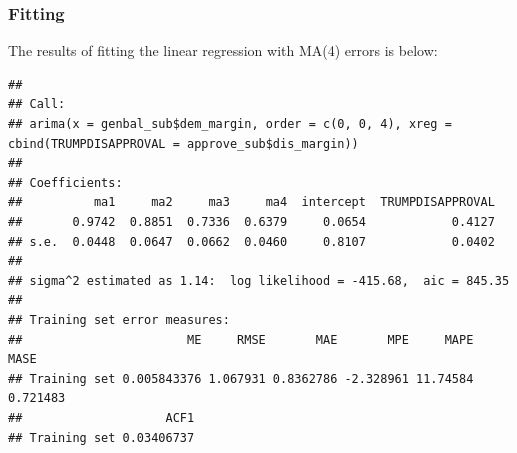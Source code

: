 \documentclass[]{article}
\newenvironment{Shaded}{\begin{snugshade}}{\end{snugshade}}
\newcommand{\KeywordTok}[1]{\textcolor[rgb]{0.13,0.29,0.53}{\textbf{#1}}}
\newcommand{\DataTypeTok}[1]{\textcolor[rgb]{0.13,0.29,0.53}{#1}}
\newcommand{\DecValTok}[1]{\textcolor[rgb]{0.00,0.00,0.81}{#1}}
\newcommand{\StringTok}[1]{\textcolor[rgb]{0.31,0.60,0.02}{#1}}
\newcommand{\OperatorTok}[1]{\textcolor[rgb]{0.81,0.36,0.00}{\textbf{#1}}}
\newcommand{\NormalTok}[1]{#1}
\begin{document}
\subsubsection{Fitting}\label{fitting-1}

The results of fitting the linear regression with MA(4) errors is below:

\begin{Shaded}
\end{Shaded}

\begin{verbatim}
## 
## Call:
## arima(x = genbal_sub$dem_margin, order = c(0, 0, 4), xreg = cbind(TRUMPDISAPPROVAL = approve_sub$dis_margin))
## 
## Coefficients:
##          ma1     ma2     ma3     ma4  intercept  TRUMPDISAPPROVAL
##       0.9742  0.8851  0.7336  0.6379     0.0654            0.4127
## s.e.  0.0448  0.0647  0.0662  0.0460     0.8107            0.0402
## 
## sigma^2 estimated as 1.14:  log likelihood = -415.68,  aic = 845.35
## 
## Training set error measures:
##                       ME     RMSE       MAE       MPE     MAPE     MASE
## Training set 0.005843376 1.067931 0.8362786 -2.328961 11.74584 0.721483
##                    ACF1
## Training set 0.03406737
\end{verbatim}

\begin{Shaded}
\end{Shaded}
\end{document}
